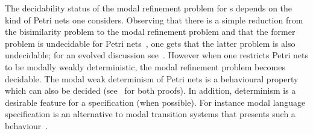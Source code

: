 The decidability status of the modal refinement problem for {\MAIOPN}s
depends on the kind of Petri nets one considers. Observing that there is
a simple reduction from the bisimilarity problem to the modal refinement
problem and that the former problem is undecidable for Petri nets~\cite{Jancar95},
one gets that the latter problem is also undecidable; for an evolved discussion see~\cite{BK12}. However when one restricts
Petri nets to be modally weakly deterministic, the modal refinement problem becomes
decidable. The modal weak determinism of Petri nets is a behavioural property
which can also be decided (see~\cite{EHH12} for both proofs). In addition, determinism is
a desirable feature for a specification (when possible). For instance modal language specification
is an alternative to modal transition systems that presents such a behaviour~\cite{Raclet2007b}.




